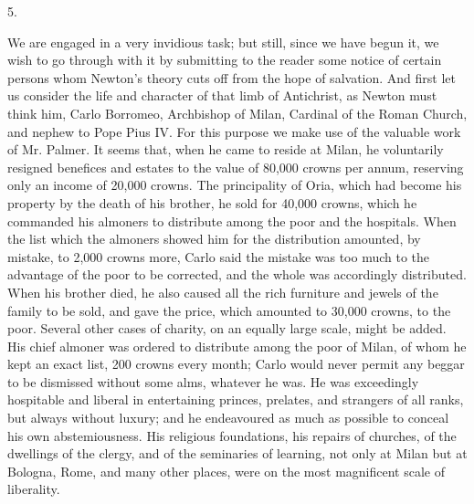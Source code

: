 5.

We are engaged in a very invidious task; but still, since we have
begun it, we wish to go through with it by submitting to the reader
some notice of certain persons whom Newton's theory cuts off from the
hope of salvation. And first let us consider the life and character of
that limb of Antichrist, as Newton must think him, Carlo Borromeo,
Archbishop of Milan, Cardinal of the Roman Church, and nephew to Pope
Pius IV. For this purpose we make use of the valuable work of Mr.
Palmer. It seems that, when he came to reside at Milan, he voluntarily
resigned benefices and estates to the value of 80,000 crowns per
annum, reserving only an income of 20,000 crowns. The principality of
Oria, which had become his property by the death of his brother, he
sold for 40,000 crowns, which he commanded his almoners to distribute
among the poor and the hospitals. When the list which the almoners
showed him for the distribution amounted, by mistake, to 2,000 crowns
more, Carlo said the mistake was too much to the advantage of the poor
to be corrected, and the whole was accordingly distributed. When his
brother died, he also caused all the rich furniture and jewels of the
family to be sold, and gave the price, which amounted to 30,000
crowns, to the poor. Several other cases of charity, on an equally
large scale, might be added. His chief almoner was ordered to
distribute among the poor of Milan, of whom he kept an exact list, 200
crowns every month; Carlo would never permit any beggar to be
dismissed without some alms, whatever he was. He was exceedingly
hospitable and liberal in entertaining princes, prelates, and
strangers of all ranks, but always without luxury; and he endeavoured
as much as possible to conceal his own abstemiousness. His religious
foundations, his repairs of churches, of the dwellings of the clergy,
and of the seminaries of learning, not only at Milan but at Bologna,
Rome, and many other places, were on the most magnificent scale of
liberality.

